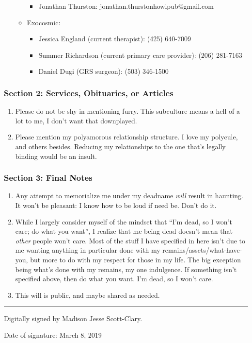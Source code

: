 \begin{enumerate}
\begin{itemize}
    \begin{itemize}
    \tightlist
    \item
      Jonathan Thurston: jonathan.thurstonhowlpub@gmail.com
    \end{itemize}
  \item
    Exocosmic:

    \begin{itemize}
    \tightlist
    \item
      Jessica England (current therapist): (425) 640-7009
    \item
      Summer Richardson (current primary care provider): (206) 281-7163
    \item
      Daniel Dugi (GRS surgeon): (503) 346-1500
    \end{itemize}
  \end{itemize}
\end{enumerate}

\subsubsection*{Section 2: Services, Obituaries, or Articles}\label{section-2-services-obituaries-or-articles}

\begin{enumerate}
\def\labelenumi{\arabic{enumi}.}
\tightlist
\item
  Please do not be shy in mentioning furry. This subculture means a hell of a lot to me, I don't want that downplayed.
\item
  Please mention my polyamorous relationship structure. I love my polycule, and others besides. Reducing my relationships to the one that's legally binding would be an insult.
\end{enumerate}

\subsubsection*{Section 3: Final Notes}\label{section-3-final-notes}

\begin{enumerate}
\def\labelenumi{\arabic{enumi}.}
\tightlist
\item
  Any attempt to memorialize me under my deadname \emph{will} result in haunting. It won't be pleasant: I know how to be loud if need be. Don't do it.
\item
  While I largely consider myself of the mindset that ``I'm dead, so I won't care; do what you want'', I realize that me being dead doesn't mean that \emph{other} people won't care. Most of the stuff I have specified in here isn't due to me wanting anything in particular done with my remains/assets/what-have-you, but more to do with my respect for those in my life. The big exception being what's done with my remains, my one indulgence. If something isn't specified above, then do what you want. I'm dead, so I won't care.
\item
  This will is public, and maybe shared as needed.
\end{enumerate}

\begin{center}\rule{0.5\linewidth}{\linethickness}\end{center}

Digitally signed by Madison Jesse Scott-Clary.

Date of signature: March 8, 2019
